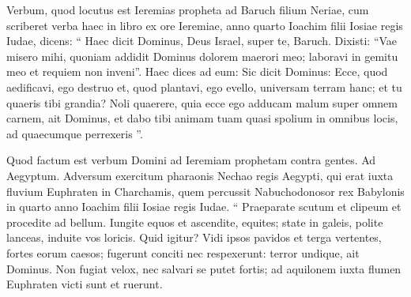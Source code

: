 \begin{biblechapter}
\begin{biblechapter}
\begin{biblechapter}
\begin{biblechapter}
\begin{biblechapter}
\begin{biblechapter}
\begin{biblechapter}
\begin{biblechapter}
\begin{biblechapter}
\begin{biblechapter}
\begin{biblechapter}
\begin{biblechapter}
\begin{biblechapter}
\begin{biblechapter}
\begin{biblechapter}
\begin{biblechapter}
\begin{biblechapter}
\begin{biblechapter}
\begin{biblechapter}
\begin{biblechapter}
\begin{biblechapter}
\begin{biblechapter}
\begin{biblechapter}
\begin{biblechapter}
\begin{biblechapter}
\begin{biblechapter}
\begin{biblechapter}
\begin{biblechapter}
\begin{biblechapter}
\begin{biblechapter}
\begin{biblechapter}
\begin{biblechapter}
\begin{biblechapter}
\begin{biblechapter}
\begin{biblechapter}
\begin{biblechapter}
\begin{biblechapter}
\begin{biblechapter}
\begin{biblechapter}
\begin{biblechapter}
\begin{biblechapter}
\begin{biblechapter}
\begin{biblechapter}
\begin{biblechapter}
\begin{biblechapter}
\verse Verbum, quod locutus est Ieremias propheta ad Baruch filium Neriae, cum scriberet verba haec in libro ex ore Ieremiae, anno quarto Ioachim filii Iosiae regis Iudae, dicens: 
\verse “ Haec dicit Dominus, Deus Israel, super te, Baruch. 
 \verse Dixisti: “Vae misero mihi, quoniam addidit Dominus dolorem maerori meo; laboravi in gemitu meo et requiem non inveni”. 
\verse Haec dices ad eum: Sic dicit Dominus: Ecce, quod aedificavi, ego destruo et, quod plantavi, ego evello, universam terram hanc; 
\verse et tu quaeris tibi grandia? Noli quaerere, quia ecce ego adducam malum super omnem carnem, ait Dominus, et dabo tibi animam tuam quasi spolium in omnibus locis, ad quaecumque perrexeris ”.
 
\begin{biblechapter}
\verse Quod factum est verbum Domini ad Ieremiam prophetam contra gentes.
 \verse Ad Aegyptum.
 Adversum exercitum pharaonis Nechao regis Aegypti, qui erat iuxta fluvium Euphraten in Charchamis, quem percussit Nabuchodonosor rex Babylonis in quarto anno Ioachim filii Iosiae regis Iudae.
 \verse “ Praeparate scutum et clipeum
 et procedite ad bellum.
 \verse Iungite equos et ascendite, equites;
 state in galeis, polite lanceas, induite vos loricis.
 \verse Quid igitur? Vidi ipsos pavidos et terga vertentes,
 fortes eorum caesos;
 fugerunt conciti nec respexerunt:
 terror undique,
 ait Dominus.
 \verse Non fugiat velox,
 nec salvari se putet fortis;
 ad aquilonem iuxta flumen Euphraten
 victi sunt et ruerunt.

\end{biblechapter}
\end{biblechapter}
\end{biblechapter}
\end{biblechapter}
\end{biblechapter}
\end{biblechapter}
\end{biblechapter}
\end{biblechapter}
\end{biblechapter}
\end{biblechapter}
\end{biblechapter}
\end{biblechapter}
\end{biblechapter}
\end{biblechapter}
\end{biblechapter}
\end{biblechapter}
\end{biblechapter}
\end{biblechapter}
\end{biblechapter}
\end{biblechapter}
\end{biblechapter}
\end{biblechapter}
\end{biblechapter}
\end{biblechapter}
\end{biblechapter}
\end{biblechapter}
\end{biblechapter}
\end{biblechapter}
\end{biblechapter}
\end{biblechapter}
\end{biblechapter}
\end{biblechapter}
\end{biblechapter}
\end{biblechapter}
\end{biblechapter}
\end{biblechapter}
\end{biblechapter}
\end{biblechapter}
\end{biblechapter}
\end{biblechapter}
\end{biblechapter}
\end{biblechapter}
\end{biblechapter}
\end{biblechapter}
\end{biblechapter}
\end{biblechapter}
